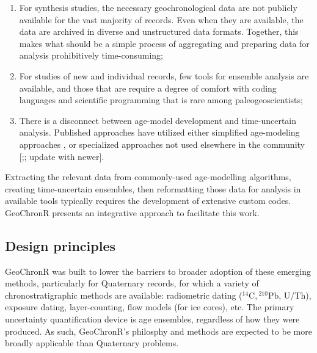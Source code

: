 \documentclass[gchron, manuscript]{copernicus}
\begin{document}
\begin{enumerate}
\def\labelenumi{\arabic{enumi}.}
\item
  For synthesis studies, the necessary geochronological data are not publicly available for the vast majority of records. Even when they are available, the data are archived in diverse and unstructured data formats. Together, this makes what should be a simple process of aggregating and preparing data for analysis prohibitively time-consuming;
\item
  For studies of new and individual records, few tools for ensemble analysis are available, and those that are require a degree of comfort with coding languages and scientific programming that is rare among paleogeoscientists;
\item
  There is a disconnect between age-model development and time-uncertain analysis. Published approaches have utilized either simplified age-modeling approaches \citep[e.g,][]{Haam_Huybers2010, routson2019mid}, or specialized approaches not used elsewhere in the community {[}\citet{Marcott_Science2013};\citet{Tierney2013}; update with newer{]}.
\end{enumerate}

Extracting the relevant data from commonly-used age-modelling algorithms, creating time-uncertain ensembles, then reformatting those data for analysis in available tools typically requires the development of extensive custom codes.
GeoChronR presents an integrative approach to facilitate this work.

\subsection{Design principles}

GeoChronR was built to lower the barriers to broader adoption of these emerging methods, particularly for Quaternary records, for which a variety of chronostratigraphic methods are available: radiometric dating (\({}^{14}\mathrm{C}, {}^{210}\mathrm{Pb}\), U/Th), exposure dating, layer-counting, flow models (for ice cores), etc. The primary uncertainty quantification device is age ensembles, regardless of how they were produced. As such, GeoChronR's philosphy and methods are expected to be more broadly applicable than Quaternary problems.
\end{document}
